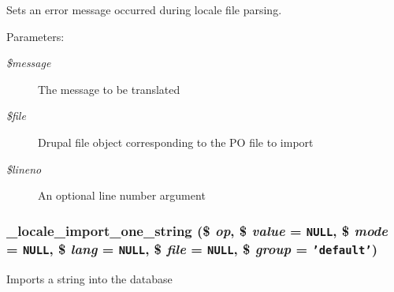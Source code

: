 Sets an error message occurred during locale file parsing.

\begin{Desc}
\item[Parameters:]
\begin{description}
\item[{\em \$message}]The message to be translated \item[{\em \$file}]Drupal file object corresponding to the PO file to import \item[{\em \$lineno}]An optional line number argument \end{description}
\end{Desc}
\hypertarget{group__locale_gc065dc774e2258493b661c45c455c709}{
\subsubsection[{\_\-locale\_\-import\_\-one\_\-string}]{\setlength{\rightskip}{0pt plus 5cm}\_\-locale\_\-import\_\-one\_\-string (\$ {\em op}, \/  \$ {\em value} = {\tt NULL}, \/  \$ {\em mode} = {\tt NULL}, \/  \$ {\em lang} = {\tt NULL}, \/  \$ {\em file} = {\tt NULL}, \/  \$ {\em group} = {\tt 'default'})}}
\label{group__locale_gc065dc774e2258493b661c45c455c709}


Imports a string into the database

